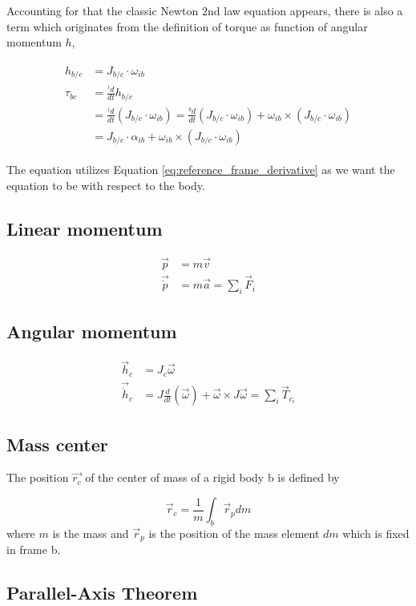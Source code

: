 Accounting for that the classic Newton 2nd law equation appears, there is also a term which originates from the definition of torque as function of angular momentum $h$,

\begin{align}
    \begin{split}
        h_{b/c} &= J_{b/c} \cdot \omega_{ib}
        \\
        \tau_{bc} &= \frac{^id}{dt} h_{b/c}
        \\
        &= \frac{^id}{dt}(J_{b/c} \cdot \omega_{ib}) = \frac{^bd}{dt} (J_{b/c} \cdot \omega_{ib}) + \omega_{ib} \times (J_{b/c} \cdot \omega_{ib})
        \\
        &= J_{b/c} \cdot \alpha_{ib} + \omega_{ib} \times (J_{b/c} \cdot \omega_{ib})
    \end{split}
\end{align}

The equation utilizes Equation \eqref{eq:reference_frame_derivative} as we want the equation to be with respect to the body.

\subsection{Linear momentum}
$$
\begin{aligned}
\vec{p}&=m\vec{v}\\
\vec{\dot{p}}&=m\vec{a}=\sum_i\vec{F}_i
\end{aligned}
$$
\subsection{Angular momentum}
$$
\begin{aligned}
\vec{h}_c&= J_c\vec{\omega}\\
\vec{\dot{h}}_c&= J\frac{d}{dt}(\vec{\omega})+\vec{\omega}\times J\vec{\omega}=\sum_i\vec{T}_{c_i}
\end{aligned}
$$
\subsection{Mass center}
The position $\vec{r_c}$ of the center of mass of a rigid body b is defined by

$$
\vec{r}_c=\frac{1}{m}\int_b \vec{r}_p dm
$$
where $m$ is the mass and $\vec{r}_p$ is the position of the mass element $dm$ which is fixed in frame b.
\subsection{Parallel-Axis Theorem}


